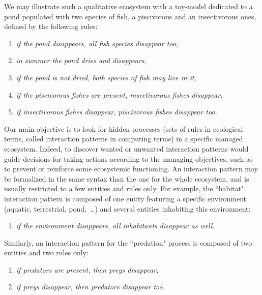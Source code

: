 \documentclass[a4paper,twoside]{article}
\begin{document}
We may illustrate such a qualitative ecosystem with a toy-model dedicated to a pond populated with two species of fish, a piscivorous and an insectivorous ones, defined by the following rules: %
\begin{enumerate}
\item %
\emph{if the pond disappears, all fish species disappear too,}
\item %
\emph{in summer the pond dries and disappears,} 
\item %
\emph{if the pond is not dried, both species of fish may live in it,} 
\item %
\emph{if the piscivorous fishes are present, insectivorous fishes disappear,}
\item %
\emph{if insectivorous fishes disappear, piscivorous fishes disappear too.}
\end{enumerate} %


Our main objective is to look for hidden processes (\ie sets of rules in ecological terms, called interaction patterns in computing terms) in a specific managed ecosystem. Indeed, to discover wanted or unwanted interaction patterns would guide decisions for taking actions according to the managing objectives, such as to prevent or reinforce some ecosystemic functioning. %
An interaction pattern may be formalized in the same syntax than the one for the whole ecosystem, and is usually restricted to a few entities and rules only. %
For example, the ``habitat" interaction pattern is composed of one entity featuring a specific environment (aquatic, terrestrial, pond,~\dots) and several entities inhabiting this environment: %
\begin{enumerate}
\item %
\emph{if the environment disappears, all inhabitants disappear as well.}
\end{enumerate} %

Similarly, 
an interaction pattern for the ``predation" process is composed of two entities and two rules only: %
%
\begin{enumerate}
\item %
\emph{if predators are present, then preys disappear,}
\item %
\emph{if preys disappear, then predators disappear too.}
\end{enumerate} %
\end{document}
